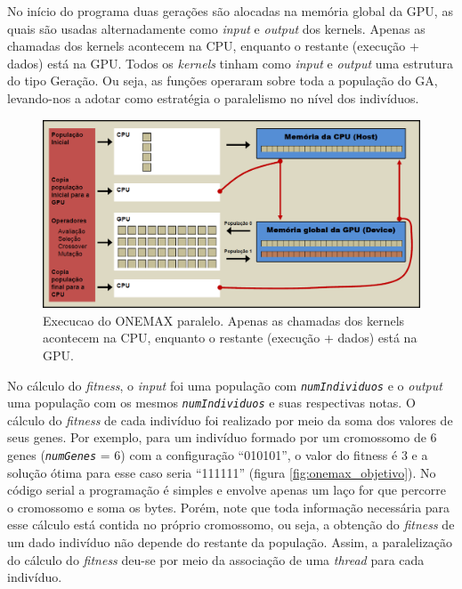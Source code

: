 	No início do programa duas gerações são alocadas na memória global da GPU, as quais são usadas alternadamente como \emph{input} e \emph{output} dos kernels. Apenas as chamadas dos kernels acontecem na CPU, enquanto o restante (execução + dados) está na GPU. Todos os \emph{kernels} tinham como \emph{input} e \emph{output} uma estrutura do tipo Geração. Ou seja, as funções operaram sobre toda a população do GA, levando-nos a adotar como estratégia o paralelismo no nível dos indivíduos.
	
	\begin{figure}[htbp]
		\centering
			\includegraphics[width=1.00\textwidth]{figs/resultados/onemax/onemax_execucao.png}
		\caption{Execucao do ONEMAX paralelo. Apenas as chamadas dos kernels acontecem na CPU, enquanto o restante (execução + dados) está na GPU.}
		\label{fig:onemax_execucao}
	\end{figure}
		
	No cálculo do \emph{fitness}, o \emph{input} foi uma população com \textit{\texttt{numIndividuos}} e o \emph{output} uma população com os mesmos \textit{\texttt{numIndividuos}} e suas respectivas notas. O cálculo do \emph{fitness} de cada indivíduo foi realizado por meio da soma dos valores de seus genes. Por exemplo, para um indivíduo formado por um cromossomo de 6 genes (\textit{\texttt{numGenes}} = 6) com a configuração “010101”, o valor do fitness é 3 e a solução ótima para esse caso seria “111111” (figura \ref{fig:onemax_objetivo}). No código serial a programação é simples e envolve apenas um laço for que percorre o cromossomo e soma os bytes. Porém, note que toda informação necessária para esse cálculo está contida no próprio cromossomo, ou seja, a obtenção do \emph{fitness} de um dado indivíduo não depende do restante da população. Assim, a paralelização do cálculo do \emph{fitness} deu-se por meio da associação de uma \emph{thread} para cada indivíduo.
	
